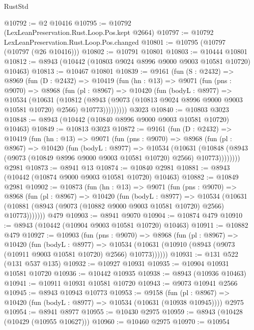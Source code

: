 \begin{lexlean}{RustStd}
\begin{coremodule}
@10792 := @2 @10416
@10795 := @10792 (LexLeanPreservation.Rust.Loop.Pos.kept @2664)
@10797 := @10792 LexLeanPreservation.Rust.Loop.Pos.changed
@10801 := @10795 (@10797 (@10797 (@26 @10416)))
@10802 := @10791 @10801
@10803 := @10444 @10801
@10812 := @8943 (@10442 (@10803 @9024 @8996 @9000 @9003 @10581 @10720) @10463)
@10813 := @10467 @10801
@10839 := @9161
    (fun (S : @2432) =>
    @8969
      (fun (D : @2432) =>
      @10419
        (fun (hn : @13) =>
        @9071
          (fun (pns : @9070) =>
          @8968
            (fun (pl : @8967) =>
            @10420
              (fun (bodyL : @8977) =>
              @10534
                (@10631
                  (@10812
                    (@8943
                      (@9073 (@10813 @9024 @8996 @9000 @9003 @10581 @10720) @2566)
                      @10773)))))))))
    @3023
@10840 := @10803 @3023
@10848 := @8943 (@10442 (@10840 @8996 @9000 @9003 @10581 @10720) @10463)
@10849 := @10813 @3023
@10872 := @9161
    (fun (D : @2432) =>
    @10419
      (fun (hn : @13) =>
      @9071
        (fun (pns : @9070) =>
        @8968
          (fun (pl : @8967) =>
          @10420
            (fun (bodyL : @8977) =>
            @10534
              (@10631
                (@10848 (@8943 (@9073 (@10849 @8996 @9000 @9003 @10581 @10720) @2566) @10773))))))))
    @2981
@10873 := @8941 @13
@10874 := @10840 @2981
@10881 := @8943 (@10442 (@10874 @9000 @9003 @10581 @10720) @10463)
@10882 := @10849 @2981
@10902 := @10873
    (fun (hn : @13) =>
    @9071
      (fun (pns : @9070) =>
      @8968
        (fun (pl : @8967) =>
        @10420
          (fun (bodyL : @8977) =>
          @10534
            (@10631 (@10881 (@8943 (@9073 (@10882 @9000 @9003 @10581 @10720) @2566) @10773)))))))
    @479
@10903 := @8941 @9070
@10904 := @10874 @479
@10910 := @8943 (@10442 (@10904 @9003 @10581 @10720) @10463)
@10911 := @10882 @479
@10927 := @10903
    (fun (pns : @9070) =>
    @8968
      (fun (pl : @8967) =>
      @10420
        (fun (bodyL : @8977) =>
        @10534 (@10631 (@10910 (@8943 (@9073 (@10911 @9003 @10581 @10720) @2566) @10773))))))
@10931 := @131 @522 (@131 @537 @135)
@10932 := @10927 @10931
@10935 := @10904 @10931 @10581 @10720
@10936 := @10442 @10935
@10938 := @8943 (@10936 @10463)
@10941 := @10911 @10931 @10581 @10720
@10943 := @9073 @10941 @2566
@10945 := @8943 @10943 @10773
@10953 := @9158
    (fun (pl : @8967) => @10420 (fun (bodyL : @8977) => @10534 (@10631 (@10938 @10945))))
    @2975
@10954 := @8941 @8977
@10955 := @10430 @2975
@10959 := @8943 (@10428 (@10429 (@10955 @10627)))
@10960 := @10460 @2975
@10970 := @10954

\end{coremodule}
\end{lexlean}
